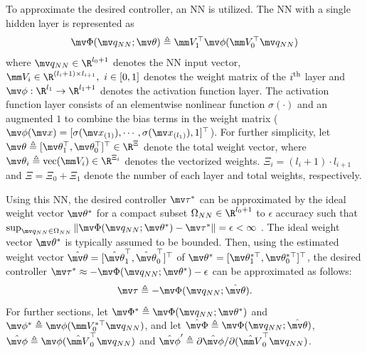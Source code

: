 \documentclass[letterpaper, 10 pt, conference]{ieeeconf}  %
\begin{document}
To approximate the desired controller, an NN is utilized.
The NN with a single hidden layer is represented as 
\begin{equation}
    \mv \Phi({\mv q_{NN}};\mv \theta)\triangleq \mm V_1^\top \mv \phi(\mm V_0^\top {\mv q_{NN}})
\end{equation}
where ${\mv q_{NN}}\in\R^{l_0+1}$ denotes the NN input vector, $\mm V_i\in\R^{(l_i+1)\times l_{i+1}},\ i\in[0,1]$ denotes the weight matrix of the $i\textsuperscript{th}$ layer and $\mv \phi:\R^{l_1}\to\R^{l_1+1}$ denotes the activation function layer.
The activation function layer consists of an elementwise nonlinear function $\sigma(\cdot)$ and an augmented $1$ to combine the bias terms in the weight matrix (\ie $\mv \phi(\mv x) = [\sigma(\mv x_{(1)}),\cdots, \sigma(\mv x_{(l_1)}), 1]^\top $).
For further simplicity, let $\mv \theta\triangleq[\mv \theta_1^\top ,\mv \theta_0^\top ]^\top \in\R^{\Xi}$ denote the total weight vector, where $\mv \theta_i\triangleq \text{vec}(\mm V_i)\in\R^{\Xi_i}$ denotes the vectorized weights.
$\Xi_i=(l_i+1)\cdot l_{i+1}$ and $\Xi=\Xi_0+\Xi_1$ denote the number of each layer and total weights, respectively.

Using this NN, the desired controller $\mv \tau^*$ can be approximated by the ideal weight vector $\mv \theta^*$ for a compact subset $\Omega_{NN}\in\R^{l_0+1}$ to $\epsilon$ accuracy such that $\sup_{{\mv q_{NN}}\in\Omega_{NN}} \allowbreak \Vert\mv \Phi({\mv q_{NN}};\mv \theta^*) - \mv \tau^*\Vert=\epsilon<\infty$ \cite{RN35}.
The ideal weight vector $\mv \theta^*$ is typically assumed to be bounded.
Then, using the estimated weight vector $\hat{\mv \theta}=[\hat{\mv \theta}_1^\top ,\hat{\mv \theta}_0^\top ]^\top $ of $\mv \theta^*=[\mv \theta_1^{*\top},\mv \theta_0^{*\top}]^\top $, the desired controller $\mv \tau^*\approx -\mv \Phi(\mv q_{NN};\mv \theta^*)-\epsilon$ can be approximated as follows:
\begin{equation}
    \mv \tau \triangleq -\mv \Phi({\mv q_{NN}};\hat{\mv \theta}).
    \label{eq. control law}
\end{equation}
For further sections, let $\mv \Phi^*\triangleq\mv \Phi({\mv q_{NN}};\mv \theta^*)$ and $\mv \phi^* \triangleq\mv \phi(\mm V_0^{*\top}{\mv q_{NN}})$, and let $\hat{\mv \Phi}\triangleq{\mv \Phi}({\mv q_{NN}};\hat{\mv \theta})$, $\hat{\mv \phi} \triangleq\mv \phi(\hat {\mm V}_0^{\top}{\mv q_{NN}})$ and $\hat{\mv \phi}' \triangleq \partial \hat{\mv \phi}/\partial (\hat {\mm V}_0^\top \mv q_{NN})$.
\end{document}
